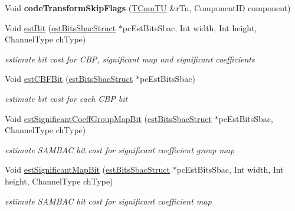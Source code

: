 \begin{DoxyCompactItemize}
\item 
\mbox{\label{class_t_enc_sbac_a987fb9287f5df62811d332eb1add9f83}} 
Void {\bfseries code\+Transform\+Skip\+Flags} (\hyperlink{class_t_com_t_u}{T\+Com\+TU} \&r\+Tu, Component\+ID component)
\item 
\mbox{\label{class_t_enc_sbac_af0837965ceb7c37495c7eeb1a1dd5786}} 
Void \hyperlink{class_t_enc_sbac_af0837965ceb7c37495c7eeb1a1dd5786}{est\+Bit} (\hyperlink{structest_bits_sbac_struct}{est\+Bits\+Sbac\+Struct} $\ast$pc\+Est\+Bits\+Sbac, Int width, Int height, Channel\+Type ch\+Type)
\begin{DoxyCompactList}\small\item\em estimate bit cost for C\+BP, significant map and significant coefficients \end{DoxyCompactList}\item 
\mbox{\label{class_t_enc_sbac_ac6716bf77ef910e6cea60d507af6971d}} 
Void \hyperlink{class_t_enc_sbac_ac6716bf77ef910e6cea60d507af6971d}{est\+C\+B\+F\+Bit} (\hyperlink{structest_bits_sbac_struct}{est\+Bits\+Sbac\+Struct} $\ast$pc\+Est\+Bits\+Sbac)
\begin{DoxyCompactList}\small\item\em estimate bit cost for each C\+BP bit \end{DoxyCompactList}\item 
\mbox{\label{class_t_enc_sbac_a6794d7c5623771982440fd13620613e8}} 
Void \hyperlink{class_t_enc_sbac_a6794d7c5623771982440fd13620613e8}{est\+Significant\+Coeff\+Group\+Map\+Bit} (\hyperlink{structest_bits_sbac_struct}{est\+Bits\+Sbac\+Struct} $\ast$pc\+Est\+Bits\+Sbac, Channel\+Type ch\+Type)
\begin{DoxyCompactList}\small\item\em estimate S\+A\+M\+B\+AC bit cost for significant coefficient group map \end{DoxyCompactList}\item 
\mbox{\label{class_t_enc_sbac_a56456332f9ba85a4a13752e2dad065be}} 
Void \hyperlink{class_t_enc_sbac_a56456332f9ba85a4a13752e2dad065be}{est\+Significant\+Map\+Bit} (\hyperlink{structest_bits_sbac_struct}{est\+Bits\+Sbac\+Struct} $\ast$pc\+Est\+Bits\+Sbac, Int width, Int height, Channel\+Type ch\+Type)
\begin{DoxyCompactList}\small\item\em estimate S\+A\+M\+B\+AC bit cost for significant coefficient map \end{DoxyCompactList}\item 

\end{DoxyCompactItemize}
